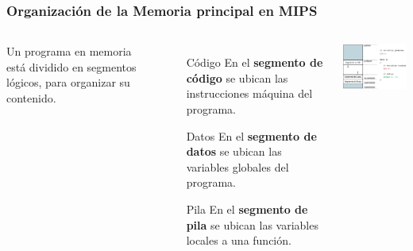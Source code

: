 \documentclass[aspectratio=169,compress]{beamer}
\begin{document}
\begin{footnotesize}
\begin{frame}
\begin{columns}[onlytextwidth,T]
    \end{columns}
\end{frame}


\begin{frame}
\frametitle{Organización de la Memoria principal en MIPS}

 \begin{columns}[onlytextwidth,T]
      \column{\dimexpr\linewidth-60mm-5mm}

  Un programa en memoria está dividido en segmentos lógicos, para organizar su contenido.
        \begin{itemize}
\bigskip
  \item[Código] En el \textbf{segmento de código} se ubican las instrucciones máquina del programa.
  \item[Datos] En el \textbf{segmento de datos} se ubican las variables globales del programa.
  \item[Pila] En el \textbf{segmento de pila} se ubican las variables locales a una función.

        \end{itemize}

      \column{60mm}
    \includegraphics[width=65mm]{images/memoria-programa.jpg}

    \end{columns}


\end{frame}




%


\end{footnotesize}
\end{document}
